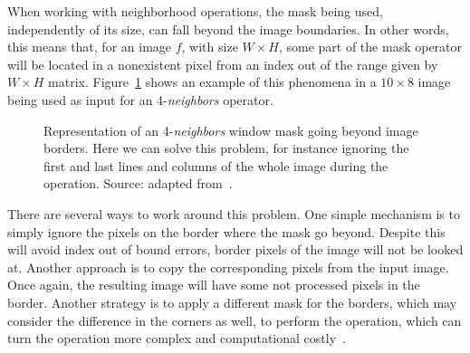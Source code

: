 When working with neighborhood operations, the mask being used, independently of its size, can fall beyond the image boundaries. In other words, this means that, for an image $f$, with size $W \times H$, some part of the mask operator will be located in a nonexistent pixel from an index out of the range given by $W \times H$ matrix. Figure~\ref{fig:img_boundaries} shows an example of this phenomena in a $10 \times 8$ image being used as input for an 4-\textit{neighbors} operator.

\begin{figure}[ht]
    \centering

    \caption[Representation of an 4-\textit{neighbors} window mask going beyond image borders]{Representation of an 4-\textit{neighbors} window mask going beyond image borders. Here we can solve this problem, for instance ignoring the first and last lines and columns of the whole image during the operation. Source: adapted from~\citet{pedrini:08}.}
    \label{fig:img_boundaries}
\end{figure}

There are several ways to work around this problem. One simple mechanism is to simply ignore the pixels on the border where the mask go beyond. Despite this will avoid index out of bound errors, border pixels of the image will not be looked at. Another approach is to copy the corresponding pixels from the input image. Once again, the resulting image will have some not processed pixels in the border. Another strategy is to apply a different mask for the borders, which may consider the difference in the corners as well, to perform the operation, which can turn the operation more complex and computational costly~\citep{pedrini:08}.


